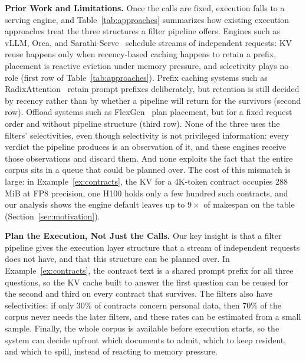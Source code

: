 \documentclass[10pt,twocolumn]{article}
\begin{document}
\textbf{Prior Work and Limitations.} Once the calls are fixed, execution falls to a serving engine, and Table~\ref{tab:approaches} summarizes how existing execution approaches treat the three structures a filter pipeline offers. Engines such as vLLM, Orca, and Sarathi-Serve~\cite{vllm,orca,sarathi} schedule streams of independent requests: KV reuse happens only when recency-based caching happens to retain a prefix, placement is reactive eviction under memory pressure, and selectivity plays no role (first row of Table~\ref{tab:approaches}). Prefix caching systems such as RadixAttention~\cite{sglang} retain prompt prefixes deliberately, but retention is still decided by recency rather than by whether a pipeline will return for the survivors (second row). Offload systems such as FlexGen~\cite{flexgen} plan placement, but for a fixed request order and without pipeline structure (third row). None of the three uses the filters' selectivities, even though selectivity is not privileged information: every verdict the pipeline produces is an observation of it, and these engines receive those observations and discard them. And none exploits the fact that the entire corpus sits in a queue that could be planned over. The cost of this mismatch is large: in Example~\ref{ex:contracts}, the KV for a 4K-token contract occupies 288\,MiB at FP8 precision, one H100 holds only a few hundred such contracts, and our analysis shows the engine default leaves up to $9\times$ of makespan on the table (Section~\ref{sec:motivation}).

\textbf{Plan the Execution, Not Just the Calls.} Our key insight is that a filter pipeline gives the execution layer structure that a stream of independent requests does not have, and that this structure can be planned over. In Example~\ref{ex:contracts}, the contract text is a shared prompt prefix for all three questions, so the KV cache built to answer the first question can be reused for the second and third on every contract that survives. The filters also have selectivities: if only 30\% of contracts concern personal data, then 70\% of the corpus never needs the later filters, and these rates can be estimated from a small sample. Finally, the whole corpus is available before execution starts, so the system can decide upfront which documents to admit, which to keep resident, and which to spill, instead of reacting to memory pressure.
\end{document}
